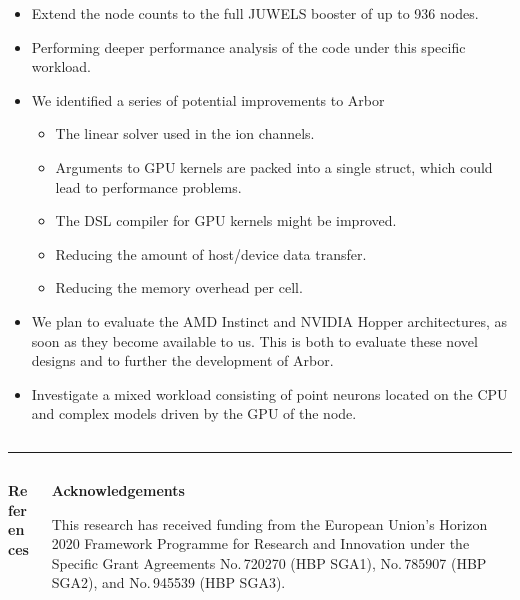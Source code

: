 \documentclass{beamer}
\begin{document}
\begin{frame}[t, fragile]
\begin{columns}[t]
\begin{column}[T]{0.25\textwidth}
      \begin{itemize}
        \item Extend the node counts to the full JUWELS booster of up to 936
              nodes.
        \item Performing deeper performance analysis of the code under this
              specific workload.
        \item We identified a series of potential improvements to Arbor
           \begin{itemize}
             \item The linear solver used in the ion channels.
             \item Arguments to GPU kernels are packed into a single
                   struct, which could lead to performance problems.
             \item The DSL compiler for GPU kernels might be improved.
             \item Reducing the amount of host/device data transfer.
             \item Reducing the memory overhead per cell.
           \end{itemize}
        \item We plan to evaluate the AMD Instinct and NVIDIA Hopper
              architectures, as soon as they become available to us. This is both
              to evaluate these novel designs and to further the development of
              Arbor.
        \item Investigate a mixed workload consisting of point neurons located
              on the CPU and complex models driven by the GPU of the node.
      \end{itemize}
    \end{column}
  \end{columns}

  \vspace*{1ex}
  \textcolor{arbred}{\rule{\textwidth}{0.5ex}}
  \vspace*{-1ex}
  \begin{columns}
    \begin{column}[T]{0.49\textwidth}
      \textbf{References}
      \printbibliography
    \end{column}
    \begin{column}[T]{0.49\textwidth}
      \textbf{Acknowledgements}

      This research has received funding from the European Union's Horizon 2020
      Framework Programme for Research and Innovation under the Specific Grant
      Agreements No.\,720270 (HBP SGA1), No.\,785907 (HBP SGA2), and No.\,945539
      (HBP SGA3).
    \end{column}
  \end{columns}
\end{frame}
\end{document}
